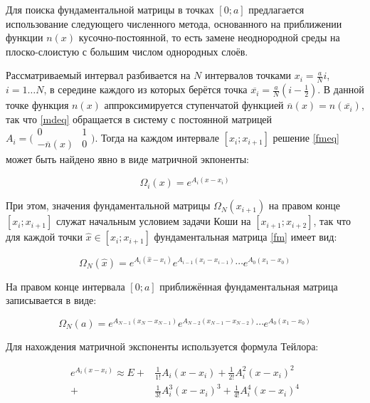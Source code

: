 \documentclass{article}
\numberwithin{equation}{section}
\begin{document}
Для поиска фундаментальной матрицы в точках $[0; a]$ предлагается
использование следующего численного метода, основанного на приближении
функции $n(x)$ кусочно-постоянной, то есть замене неоднородной среды
на плоско-слоистую с большим числом однородных слоёв.

Рассматриваемый интервал разбивается на $N$ интервалов точками
$x_i = \frac{a}{N}i$, $i = 1 \dotso N$, в середине каждого из
которых берётся точка $\overline{x_i} = \frac{a}{N}(i-\frac{1}{2})$. В
данной точке функция $n(x)$ аппроксимируется ступенчатой функцией
$\overline{n}(x) = n(\overline{x_i})$, так что \eqref{mdeq} обращается
в систему с постоянной матрицей $A_i = \bigl(
\begin{smallmatrix}0& 1 \\ -\overline{n}(x)& 0 \end{smallmatrix}
\bigr)$. Тогда на каждом интервале $[x_i; x_{i+1}]$ решение
\eqref{fmeq} может быть найдено явно в виде матричной экпоненты:

\[
\Omega_i(x) = e^{A_i (x - x_i)}
\]

При этом, значения фундаментальной матрицы $\Omega_N(x_{i+1})$ на
правом конце $[x_i; x_{i+1}]$ служат начальным условием задачи Коши на
$[x_{i+1}; x_{i+2}]$, так что для каждой точки $\hat{x} \in [x_i;
x_{i+1}]$ фундаментальная матрица \eqref{fm} имеет вид:

\begin{equation}\label{fmx}
  \Omega_N(\hat{x}) = e^{A_i(\hat{x}-x_i)} e^{A_{i-1}(x_i-x_{i-1})} \dotsm e^{A_0(x_1-x_0)}
\end{equation}

На правом конце интервала $[0; a]$ приближённая фундаментальная
матрица записывается в виде:

\begin{equation}\label{fma}
  \Omega_N(a) = e^{A_{N-1}(x_N-x_{N-1})} e^{A_{N-2}(x_{N-1}-x_{N-2})} \dotsm e^{A_0(x_1-x_0)}
\end{equation}

Для нахождения матричной экспоненты используется формула Тейлора:

\begin{equation}\label{matrix-exp}
\begin{split}
  e^{A_i(x-x_i)} \approx E +& \frac{1}{1!}{A_i(x-x_i)} +
  \frac{1}{2!}{A_i^2(x-x_i)^2}\\
  +& \frac{1}{3!}{A_i^3(x-x_i)^3} + \frac{1}{4!}{A_i^4(x-x_i)^4}
\end{split}
\end{equation}
\end{document}
